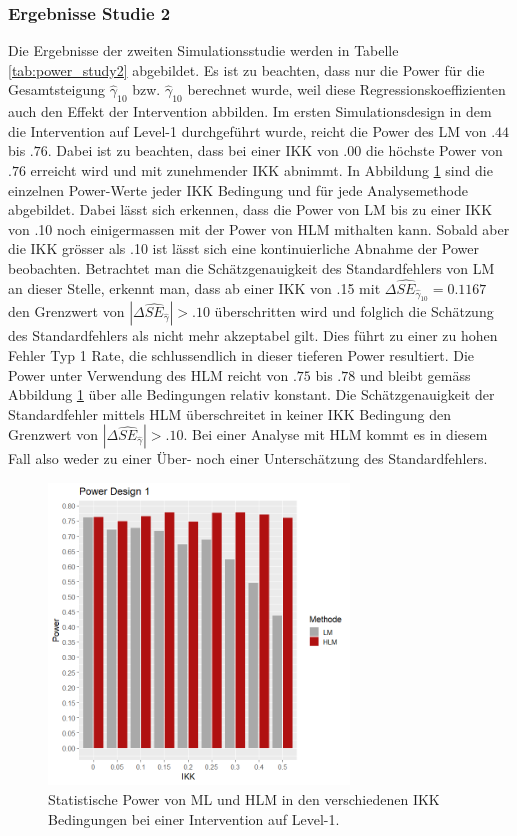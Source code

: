 \documentclass[12pt]{article}\usepackage[]{graphicx}\usepackage[]{color}
\begin{document}
\subsubsection{Ergebnisse Studie 2}
Die Ergebnisse der zweiten Simulationsstudie werden in Tabelle \ref{tab:power_study2} abgebildet. Es ist zu beachten, dass nur die Power für die Gesamtsteigung $\widehat{\gamma}_{10}$ bzw. $\widehat{\gamma}_{10}$ berechnet wurde, weil diese Regressionskoeffizienten auch den Effekt der Intervention abbilden. Im ersten Simulationsdesign in dem die Intervention auf Level-1 durchgeführt wurde, reicht die Power des LM von $.44$ bis $.76$. Dabei ist zu beachten, dass bei einer IKK von .00 die höchste Power von $.76$ erreicht wird und mit zunehmender IKK abnimmt. In Abbildung \ref{fig:power_design1} sind die einzelnen Power-Werte jeder IKK Bedingung und für jede Analysemethode abgebildet. Dabei lässt sich erkennen, dass die Power von LM bis zu einer IKK von .10 noch einigermassen mit der Power von HLM mithalten kann. Sobald aber die IKK grösser als .10 ist lässt sich eine kontinuierliche Abnahme der Power beobachten. Betrachtet man die Schätzgenauigkeit des Standardfehlers von LM an dieser Stelle, erkennt man, dass ab einer IKK von .15 mit $\Delta\widehat{SE}_{\widehat{\gamma}_{10}} = 0.1167$ den Grenzwert von $|\Delta\widehat{SE}_{\widehat{\gamma}}| > .10$ \citep{hooglandboosma1998robustness} überschritten wird und folglich die Schätzung des Standardfehlers als nicht mehr akzeptabel gilt. Dies führt zu einer zu hohen Fehler Typ 1 Rate, die schlussendlich  in dieser tieferen Power resultiert. Die Power unter Verwendung des HLM reicht von $.75$ bis $.78$ und bleibt gemäss Abbildung \ref{fig:power_design1} über alle Bedingungen relativ konstant. Die Schätzgenauigkeit der Standardfehler mittels HLM überschreitet in keiner IKK Bedingung den Grenzwert von $|\Delta\widehat{SE}_{\widehat{\gamma}}| > .10$. Bei einer Analyse mit HLM kommt es in diesem Fall also weder zu einer Über- noch einer Unterschätzung des Standardfehlers.
\begin{figure}[t!]
\centering
\captionsetup{width=8cm}
\includegraphics[width=8cm, height=8cm]{power_design1}
\caption{Statistische Power von ML und HLM in den verschiedenen IKK Bedingungen bei einer Intervention auf Level-1.}
\label{fig:power_design1}
\end{figure}
\end{document}
